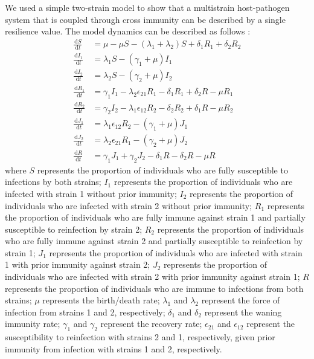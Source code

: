 \documentclass[12pt]{article}
\newcommand{\dd}[1]{\ensuremath{\, \mathrm{d}#1}}
\begin{document}
We used a simple two-strain model to show that a multistrain host-pathogen system that is coupled through cross immunity can be described by a single resilience value.
The model dynamics can be described as follows \citep{bhattacharyya2015cross}: 
\begin{align}
\frac{\dd S}{\dd t} &= \mu - \mu S - (\lambda_1 + \lambda_2) S + \delta_1 R_1 + \delta_2 R_2 \\
\frac{\dd I_1}{\dd t} &= \lambda_1 S - (\gamma_1 + \mu) I_1 \\
\frac{\dd I_2}{\dd t} &= \lambda_2 S - (\gamma_2 + \mu) I_2 \\
\frac{\dd R_1}{\dd t} &= \gamma_1 I_1 - \lambda_2 \epsilon_{21} R_1 - \delta_1 R_1 + \delta_2 R - \mu R_1\\
\frac{\dd R_2}{\dd t} &= \gamma_2 I_2 - \lambda_1 \epsilon_{12} R_2 - \delta_2 R_2 + \delta_1 R - \mu R_2\\
\frac{\dd J_1}{\dd t} &= \lambda_1 \epsilon_{12} R_2 - (\gamma_1 + \mu) J_1\\
\frac{\dd J_2}{\dd t} &= \lambda_2 \epsilon_{21} R_1 - (\gamma_2 + \mu) J_2\\
\frac{\dd R}{\dd t} &= \gamma_1 J_1 + \gamma_2 J_2 - \delta_1 R - \delta_2 R - \mu R
\end{align}
where $S$ represents the proportion of individuals who are fully susceptible to infections by both strains;
$I_1$ represents the proportion of individuals who are infected with strain 1 without prior immunity;
$I_2$ represents the proportion of individuals who are infected with strain 2 without prior immunity;
$R_1$ represents the proportion of individuals who are fully immune against strain 1 and partially susceptible to reinfection by strain 2;
$R_2$ represents the proportion of individuals who are fully immune against strain 2 and partially susceptible to reinfection by strain 1;
$J_1$ represents the proportion of individuals who are infected with strain 1 with prior immunity against strain 2;
$J_2$ represents the proportion of individuals who are infected with strain 2 with prior immunity against strain 1;
$R$ represents the proportion of individuals who are immune to infections from both strains;
$\mu$ represents the birth/death rate;
$\lambda_1$ and $\lambda_2$ represent the force of infection from strains 1 and 2, respectively;
$\delta_1$ and $\delta_2$ represent the waning immunity rate;
$\gamma_1$ and $\gamma_2$ represent the recovery rate;
$\epsilon_{21}$ and $\epsilon_{12}$ represent the susceptibility to reinfection with strains 2 and 1, respectively, given prior immunity from infection with strains 1 and 2, respectively. 
\end{document}
